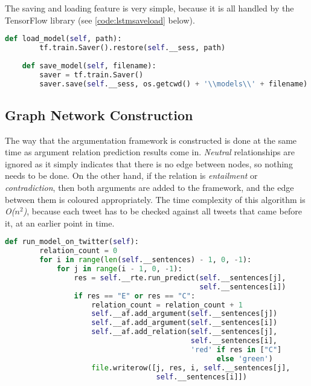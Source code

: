             The saving and loading feature is very simple, because it is all handled by the TensorFlow library (see \cref{code:lstmsaveload} below).
            
            \begin{lstlisting}[language=Python, caption=Saving and Loading Functions, label=code:lstmsaveload]
    def load_model(self, path):
        tf.train.Saver().restore(self.__sess, path)
        
    def save_model(self, filename):
        saver = tf.train.Saver()
        saver.save(self.__sess, os.getcwd() + '\\models\\' + filename)
            \end{lstlisting}
    
    \subsection{Graph Network Construction} \label{graphnetwork}
    
        The way that the argumentation framework is constructed is done at the same time as argument relation prediction results come in. \textit{Neutral} relationships are ignored as it simply indicates that there is no edge between nodes, so nothing needs to be done. On the other hand, if the relation is \textit{entailment} or \textit{contradiction}, then both arguments are added to the framework, and the edge between them is coloured appropriately. The time complexity of this algorithm is \textit{O(}$n^2$\textit{)}, because each tweet has to be checked against all tweets that came before it, at an earlier point in time.
        
        \begin{lstlisting}[language=Python, caption=Constructing Directed Graph from Results, label=code:lstmdigraph]
    def run_model_on_twitter(self):
        relation_count = 0
        for i in range(len(self.__sentences) - 1, 0, -1):
            for j in range(i - 1, 0, -1):
                res = self.__rte.run_predict(self.__sentences[j], 
                                             self.__sentences[i])
                if res == "E" or res == "C":
                    relation_count = relation_count + 1
                    self.__af.add_argument(self.__sentences[j])
                    self.__af.add_argument(self.__sentences[i])
                    self.__af.add_relation(self.__sentences[j], 
                                           self.__sentences[i],
                                           'red' if res in ["C"] 
                                                 else 'green')
                    file.writerow([j, res, i, self.__sentences[j],
                                   self.__sentences[i]])
            \end{lstlisting}
            
